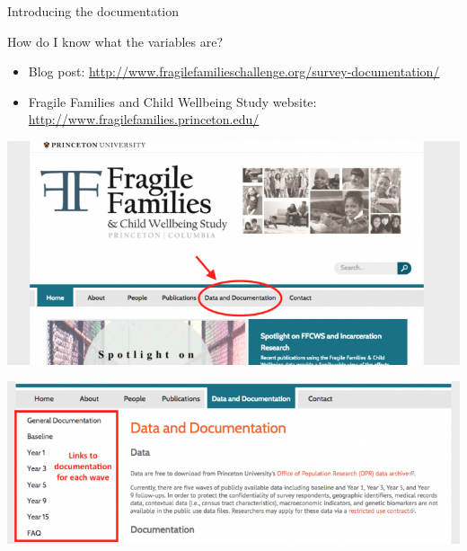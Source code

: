 \documentclass{beamer}
\begin{document}
\begin{frame}

\Large{
\begin{center}
Introducing the documentation
\end{center}
}

\end{frame}
\begin{frame}

How do I know what the variables are? 
\begin{itemize}
\item Blog post: \textcolor{blue}{\href{www.fragilefamilieschallenge.org/survey-documentation/}{http://www.fragilefamilieschallenge.org/survey-documentation/}}
\item Fragile Families and Child Wellbeing Study website: \textcolor{blue}{\href{www.fragilefamilies.princeton.edu/}{http://www.fragilefamilies.princeton.edu/}}
\end{itemize}

\end{frame}
\begin{frame}

\centering\includegraphics[width = .8\textwidth]{figures/Doc1}

\end{frame}
\begin{frame}

\centering\includegraphics[width = .8\textwidth]{figures/Doc2}

\end{frame}
\end{document}
